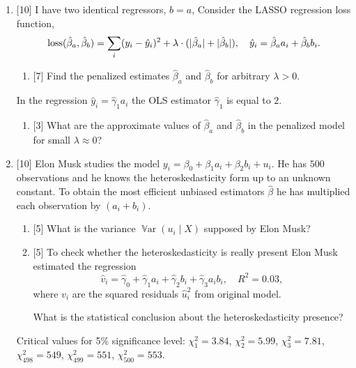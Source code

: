 \documentclass[12pt]{article}
\DeclareMathOperator{\Var}{\mathbb{V}ar}
\DeclareMathOperator{\loss}{loss}
\newcommand{\hb}{\hat{\beta}}
\DeclarePairedDelimiter{\abs}{\lvert}{\rvert}
\begin{document}
\begin{enumerate}
    \item {[10]} I have two identical regressors, $b = a$, 
    Consider the LASSO regression loss function,  
    \[
    \loss(\hb_a, \hb_b) = \sum_i (y_i - \hat y_i)^2 + \lambda \cdot (\abs{\hb_a} + \abs{\hb_b}), \quad \hat y_i = \hb_a a_i + \hb_b b_i.
    \] 
    \begin{enumerate}
        \item {[7]} Find the penalized estimates $\hb_a$ and $\hb_b$ for arbitrary $\lambda > 0$.
    \end{enumerate}
    In the regression $\hat y_i = \hat\gamma_1 a_i$ the OLS estimator $\hat\gamma_1$ is equal to $2$.
    \begin{enumerate}[resume]
        \item {[3]} What are the approximate values of $\hb_a$ and $\hb_b$ in the penalized model for small $\lambda \approx 0$?
    \end{enumerate}
    
    \item {[10]} Elon Musk studies the model $y_i = \beta_0 + \beta_1 a_i + \beta_2 b_i + u_i$.
    He has $500$ observations and he knows the heteroskedasticity form up to an unknown constant.
    To obtain the most efficient unbiased estimators $\hb$ he has multiplied each observation by $(a_i + b_i)$. 

    \begin{enumerate}
        \item {[5]} What is the variance $\Var(u_i \mid X)$ supposed by Elon Musk?
        \item {[5]} To check whether the heteroskedasticity is really present Elon Musk estimated the regression 
        \[
        \hat v_i = \hat \gamma_0 + \hat\gamma_1 a_i + \hat\gamma_2 b_i + \hat\gamma_3 a_i b_i, \quad R^2 = 0.03,
        \]
        where $v_i$ are the squared residuals $\hat u_i^2$ from original model. 

       What is the statistical conclusion about the heteroskedasticity presence?
    \end{enumerate}

    Critical values for 5\% significance level: $\chi^2_1 = 3.84$, $\chi^2_2= 5.99$, $\chi^2_3=7.81$, $\chi^2_{498} = 549$, $\chi^2_{499} = 551$, $\chi^2_{500} = 553$.



\end{enumerate}
\end{document}
